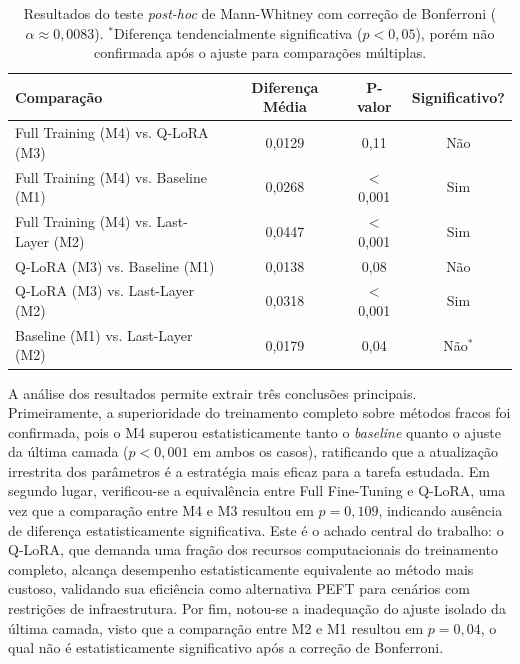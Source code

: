 \begin{table}[H]
\centering
\begin{tabular}{l c c c}
\hline
\textbf{Comparação} & \textbf{Diferença Média} & \textbf{P-valor} & \textbf{Significativo?} \\
\hline
Full Training (M4) vs. Q-LoRA (M3)     & 0,0129 & 0,11    & Não \\
Full Training (M4) vs. Baseline (M1)   & 0,0268 & $<$0,001 & Sim \\
Full Training (M4) vs. Last-Layer (M2) & 0,0447 & $<$0,001 & Sim \\
Q-LoRA (M3) vs. Baseline (M1)          & 0,0138 & 0,08    & Não \\
Q-LoRA (M3) vs. Last-Layer (M2)        & 0,0318 & $<$0,001 & Sim \\
Baseline (M1) vs. Last-Layer (M2)      & 0,0179 & 0,04    & Não$^{*}$ \\
\hline
\end{tabular}
\caption{Resultados do teste \textit{post-hoc} de Mann-Whitney com correção de Bonferroni ($\alpha \approx 0,0083$). $^{*}$Diferença tendencialmente significativa ($p < 0,05$), porém não confirmada após o ajuste para comparações múltiplas.}
\label{tab:comparacao_treinamento}
\end{table}

A análise dos resultados permite extrair três conclusões principais. Primeiramente, a superioridade do treinamento completo sobre métodos fracos foi confirmada, pois o M4 superou estatisticamente tanto o \textit{baseline} quanto o ajuste da última camada ($p < 0,001$ em ambos os casos), ratificando que a atualização irrestrita dos parâmetros é a estratégia mais eficaz para a tarefa estudada. Em segundo lugar, verificou-se a equivalência entre Full Fine-Tuning e Q-LoRA, uma vez que a comparação entre M4 e M3 resultou em $p = 0,109$, indicando ausência de diferença estatisticamente significativa. Este é o achado central do trabalho: o Q-LoRA, que demanda uma fração dos recursos computacionais do treinamento completo, alcança desempenho estatisticamente equivalente ao método mais custoso, validando sua eficiência como alternativa PEFT para cenários com restrições de infraestrutura. Por fim, notou-se a inadequação do ajuste isolado da última camada, visto que a comparação entre M2 e M1 resultou em $p = 0,04$, o qual não é estatisticamente significativo após a correção de Bonferroni.

